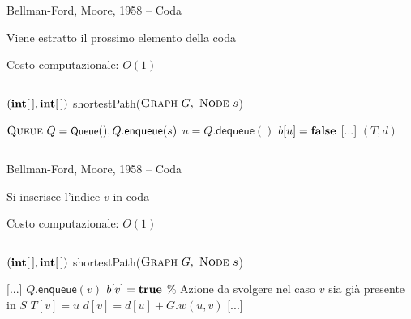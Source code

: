 \begin{frame}{Bellman-Ford, Moore, 1958 -- Coda}

\vspace{-9pt}
\begin{myboxtitle}
\BI
\item Viene estratto il prossimo elemento della coda
\item Costo computazionale: $O(1)$
\EI
\end{myboxtitle}

\vspace{-18pt}
\begin{columns}
\small
\begin{Procedure}
\caption[A]{$(\INTARRAY, \INTARRAY)$ \textsf{shortestPath}($\textsc{Graph}\ G,\ \textsc{Node}\ s$)}
$\textsc{Queue}\ Q = \textsf{{\small Queue}}(); Q.\textsf{enqueue}(s)$\;
{
  \alert{$u = Q.\textsf{dequeue}()$}\;
  $b[u] = \FALSE$\;
  {
    {
      [...]
    }
  }
}
\Return $(T,d)$
\end{Procedure}
\end{columns}

\end{frame}

\begin{frame}{Bellman-Ford, Moore, 1958 -- Coda}

\vspace{-9pt}
\begin{myboxtitle}
\BI
\item Si inserisce l'indice $v$ in coda
\item Costo computazionale: $O(1)$
\EI
\end{myboxtitle}

\vspace{-18pt}
\begin{columns}
\small
\begin{Procedure}
\caption[A]{$(\INTARRAY, \INTARRAY)$ \textsf{shortestPath}($\textsc{Graph}\ G,\ \textsc{Node}\ s$)}
[...]\;
    {
      {
        \alert{$Q.\textsf{enqueue}(v)$}\;
        $b[v] = \TRUE$\;
      }
      {
        \% Azione da svolgere nel caso $v$ sia già presente in $S$
      }
      $T[v] = u$\;
      $d[v] = d[u] + G.w(u,v)$\;
    }
[...]\;
\end{Procedure}
\end{columns}

\end{frame}

